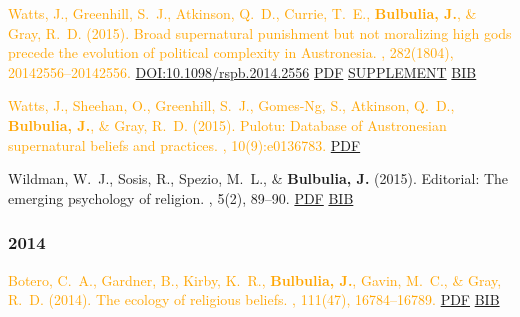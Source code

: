\documentclass{article}
\begin{document}
\begin{thebibliography}{99}
\textcolor{Orange}{Watts, J., Greenhill, S.~J., Atkinson, Q.~D., Currie, T.~E., {\bf Bulbulia, J.}, \&
  Gray, R.~D. (2015).
\newblock Broad supernatural punishment but not moralizing high gods precede
  the evolution of political complexity in Austronesia.
, 282(1804), 20142556--20142556.
\href{https://doi.org/10.1098/rspb.2014.2556}{DOI:10.1098/rspb.2014.2556}}
\href{https://www.dropbox.com/s/kx3br0orme0dztr/20142556.full.pdf?dl=0}{PDF} \href{https://www.dropbox.com/s/xlj936kpv3obvhc/rspb20142556supp1.pdf?dl=0}{SUPPLEMENT} 
\href{https://www.dropbox.com/s/jpwqqqtqiomvnqe/broad-supernatural-punishment-but-not-moralizing-high-gods-precede-the-evolution-of-political-complexity-in-austronesia.bib?dl=0}{BIB} 


\textcolor{Orange}{Watts, J., Sheehan, O., Greenhill, S.~J., Gomes-Ng, S., Atkinson, Q.~D.,
  {\bf Bulbulia, J.}, \& Gray, R.~D. (2015).
\newblock Pulotu: Database of Austronesian supernatural beliefs and practices. 
, 10(9):e0136783.}
 \href{https://www.dropbox.com/s/x7nw0co4clo1lkb/journal.pone.0136783.pdf?dl=0}{PDF}


Wildman, W.~J., Sosis, R., Spezio, M.~L., \& {\bf Bulbulia, J.} (2015). Editorial:
\newblock The emerging psychology of religion.
, 5(2), 89--90. 
\href{https://www.dropbox.com/s/wv6tlmlec5r5lhp/2015.WildmanEtAl.EmergingPysch.Rbb.pdf?dl=0}{PDF} \href{https://www.dropbox.com/s/or9ty6xkr8zsy0r/tandf_rrbb205_89.bib?dl=0}{BIB}



\subsubsection*{2014} 



\textcolor{Orange}{Botero, C.~A., Gardner, B., Kirby, K.~R., {\bf Bulbulia, J.}, Gavin, M.~C., \& Gray,
  R.~D. (2014).
\newblock The ecology of religious beliefs.
,
  111(47), 16784--16789. }
\href{http://www.pnas.org/content/early/2014/11/05/1408701111.abstract?sid=852fbd5d-6be1-4888-8126-1e4ef7c787bd}{PDF} \href{https://www.dropbox.com/s/4kmuja16tvei26q/2014.boteroEtAl.bib?dl=0}{BIB}



\end{thebibliography}
\end{document}
